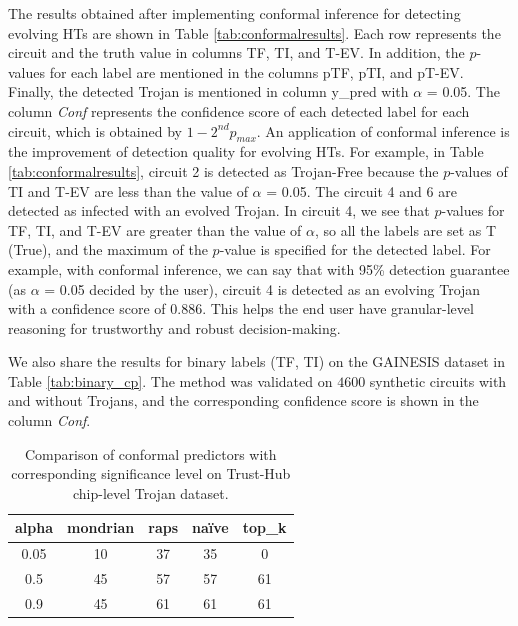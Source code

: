 The results obtained after implementing conformal inference for detecting evolving HTs are shown in Table \ref{tab:conformalresults}. Each row represents the circuit and the truth value in columns TF, TI, and T-EV. In addition, the $p$-values for each label are mentioned in the columns pTF, pTI, and pT-EV. Finally, the detected Trojan is mentioned in column y\_pred with $\alpha$ = 0.05. The column \textit{Conf} represents the confidence score of each detected label for each circuit, which is obtained by $1 - 2^{nd}p_{max}$. An application of conformal inference is the improvement of detection quality for evolving HTs. For example, in Table \ref{tab:conformalresults}, circuit 2 is detected as Trojan-Free because the $p$-values of TI and T-EV are less than the value of $\alpha$ = 0.05. The circuit 4 and 6 are detected as infected with an evolved Trojan. In circuit 4, we see that $p$-values for TF, TI, and T-EV are greater than the value of $\alpha$, so all the labels are set as T (True), and the maximum of the $p$-value is specified for the detected label. For example, with conformal inference, we can say that with 95\% detection guarantee (as $\alpha$ = 0.05 decided by the user), circuit 4 is detected as an evolving Trojan with a confidence score of 0.886. This helps the end user have granular-level reasoning for trustworthy and robust decision-making.

We also share the results for binary labels (TF, TI) on the GAINESIS dataset in Table \ref{tab:binary_cp}. The method was validated on $4600$ synthetic circuits with and without Trojans, and the corresponding confidence score is shown in the column \textit{Conf}.

\begin{table}[t]
\centering
\caption{Comparison of conformal predictors with corresponding significance level on Trust-Hub chip-level Trojan dataset.}
\begin{tabular}{ccccc}
\hline
\textbf{alpha} & \textbf{mondrian} & \textbf{raps} & \textbf{naïve} & \textbf{top\_k} \\ \hline
0.05           & 10                & 37            & 35             & 0               \\ \hline
0.5            & 45                & 57            & 57             & 61              \\ \hline
0.9            & 45                & 61            & 61             & 61              \\ \hline
\end{tabular}
\label{tab:racp}
\end{table}

